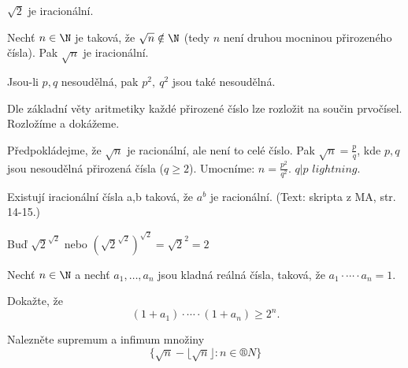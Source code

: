 \documentclass[12pt]{article}					%
\begin{document}
    \begin{priklady}[Z přednášky]
        $\sqrt{2}$ je iracionální.
    \end{priklady}

    \begin{veta}
        Nechť $n \in \N$ je taková, že $\sqrt{n} \notin \N$ (tedy $n$ není druhou mocninou přirozeného čísla). Pak $\sqrt{n}$ je iracionální.
        \begin{lemmain}
            Jsou-li $p, q$ nesoudělná, pak $p^2,\ q^2$ jsou také nesoudělná.
            \begin{dukazin}
                Dle základní věty aritmetiky každé přirozené číslo lze rozložit na součin prvočísel. Rozložíme a dokážeme.
            \end{dukazin}
        \end{lemmain}

        \begin{dukazin}[Sporem]
            Předpokládejme, že $\sqrt{n}$ je racionální, ale není to celé číslo. Pak $\sqrt{n} = \frac{p}{q}$, kde $p, q$ jsou nesoudělná přirozená čísla ($q≥2$). Umocníme: $n = \frac{p^2}{q^2}$. $q|p$ $lightning$.
        \end{dukazin}
    \end{veta}

    \begin{veta}[Referát 1]
        Existují iracionální čísla a,b taková, že $a^b$ je racionální. (Text: skripta z MA, str. 14-15.)
        \begin{dukazin}
            Buď $\sqrt{2}^{\sqrt{2}}$ nebo $(\sqrt{2}^{\sqrt{2}})^{\sqrt{2}} = {\sqrt{2}}^2 = 2$
        \end{dukazin}
    \end{veta}

    \begin{priklad}
        Nechť $n \in \N$ a nechť $a_1, …, a_n$ jsou kladná reálná čísla, taková, že $a_1 \cdot\cdots\cdot a_n = 1$.

        Dokažte, že
        $$ (1+a_1) \cdot\cdots\cdot (1+a_n) ≥ 2^n. $$ 
    \end{priklad}


    \begin{priklad}
        Nalezněte supremum a infimum množiny
        $$ \{\sqrt{n} - \lfloor\sqrt{n}\rfloor : n \in ®N\} $$ 
    \end{priklad}
\end{document}
